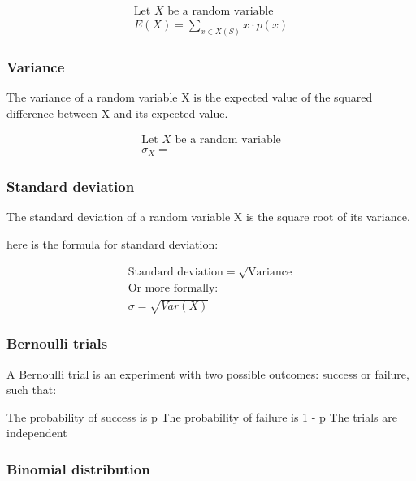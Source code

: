 \documentclass{article}
\begin{document}
\begin{align*}
    \text{Let } X \text{ be a random variable} \\
    E(X) = \sum_{x \in X(S)} x \cdot p(x)
\end{align*}

\subsubsection{Variance}

The variance of a random variable X is the expected value of the squared difference between X and its expected value.

\begin{align*}
    \text{Let } X \text{ be a random variable} \\
    \sigma_X =
\end{align*}

\subsubsection{Standard deviation}

The standard deviation of a random variable X is the square root of its variance.

here is the formula for standard deviation:

\begin{align*}
    \text{Standard deviation} = \sqrt{\text{Variance}} \\
    \text{Or more formally:}                           \\
    \sigma = \sqrt{Var(X)}
\end{align*}

\subsubsection{Bernoulli trials}

A Bernoulli trial is an experiment with two possible outcomes: success or failure, such that:

\begin{outline}
    \1 The probability of success is p
    \1 The probability of failure is 1 - p
    \1 The trials are independent
\end{outline}

\subsubsection{Binomial distribution}
\end{document}
